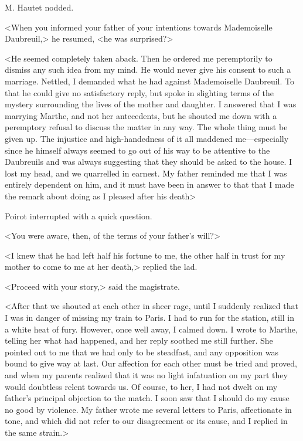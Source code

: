 M. Hautet nodded. 

 <When you informed your father of your intentions towards Mademoiselle Daubreuil,> he resumed, <he was surprised?> 

 <He seemed completely taken aback. Then he ordered me peremptorily to dismiss any such idea from my mind. He would never give his consent to such a marriage. Nettled, I demanded what he had against Mademoiselle Daubreuil. To that he could give no satisfactory reply, but spoke in slighting terms of the mystery surrounding the lives of the mother and daughter. I answered that I was marrying Marthe, and not her antecedents, but he shouted me down with a peremptory refusal to discuss the matter in any way. The whole thing must be given up. The injustice and high-handedness of it all maddened me—especially since he himself always seemed to go out of his way to be attentive to the Daubreuils and was always suggesting that they should be asked to the house. I lost my head, and we quarrelled in earnest. My father reminded me that I was entirely dependent on him, and it must have been in answer to that that I made the remark about doing as I pleased after his death\longdash> 

 Poirot interrupted with a quick question. 

 <You were aware, then, of the terms of your father's will?> 

 <I knew that he had left half his fortune to me, the other half in trust for my mother to come to me at her death,> replied the lad. 

 <Proceed with your story,> said the magistrate. 

 <After that we shouted at each other in sheer rage, until I suddenly realized that I was in danger of missing my train to Paris. I had to run for the station, still in a white heat of fury. However, once well away, I calmed down. I wrote to Marthe, telling her what had happened, and her reply soothed me still further. She pointed out to me that we had only to be steadfast, and any opposition was bound to give way at last. Our affection for each other must be tried and proved, and when my parents realized that it was no light infatuation on my part they would doubtless relent towards us. Of course, to her, I had not dwelt on my father's principal objection to the match. I soon saw that I should do my cause no good by violence. My father wrote me several letters to Paris, affectionate in tone, and which did not refer to our disagreement or its cause, and I replied in the same strain.> 

